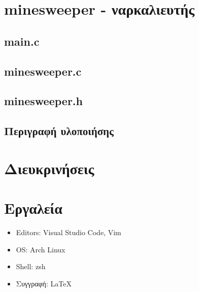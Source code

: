 \documentclass{article}
\begin{document}
\section{minesweeper - ναρκαλιευτής}

    \subsection{main.c}
        

    \subsection{minesweeper.c}
        

    \subsection{minesweeper.h}
        

    \subsection{Περιγραφή υλοποιήσης}

    

\section{Διευκρινήσεις}



\section{Εργαλεία}

    \begin{itemize}
        \item Editors: Visual Studio Code, Vim
        \item OS: Arch Linux
        \item Shell: zsh
        \item Συγγραφή: \LaTeX
    \end{itemize}
\end{document}
